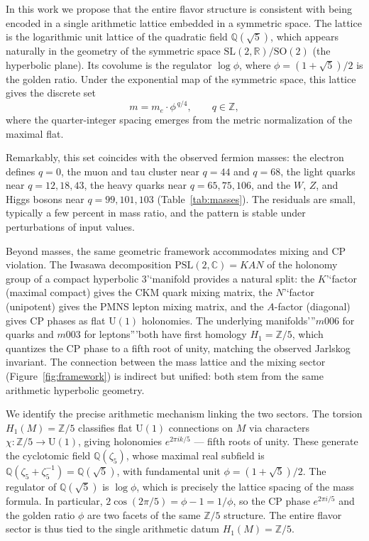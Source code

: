 \documentclass[12pt]{article}
\theoremstyle{definition}
\begin{document}
In this work we propose that the entire flavor structure is consistent with being encoded in a single arithmetic lattice embedded in a symmetric space. The lattice is the logarithmic unit lattice of the quadratic field $\mathbb{Q}(\sqrt5)$, which appears naturally in the geometry of the symmetric space $\mathrm{SL}(2,\mathbb{R})/\mathrm{SO}(2)$ (the hyperbolic plane). Its covolume is the regulator $\log\phi$, where $\phi = (1+\sqrt5)/2$ is the golden ratio. Under the exponential map of the symmetric space, this lattice gives the discrete set
\[
m = m_e \cdot \phi^{\,q/4},\qquad q\in\mathbb{Z},
\]
where the quarter-integer spacing emerges from the metric normalization of the maximal flat.

Remarkably, this set coincides with the observed fermion masses: the electron defines $q=0$, the muon and tau cluster near $q=44$ and $q=68$, the light quarks near $q=12,18,43$, the heavy quarks near $q=65,75,106$, and the $W$, $Z$, and Higgs bosons near $q=99,101,103$ (Table~\ref{tab:masses}). The residuals are small, typically a few percent in mass ratio, and the pattern is stable under perturbations of input values.

Beyond masses, the same geometric framework accommodates mixing and CP violation. The Iwasawa decomposition $\mathrm{PSL}(2,\mathbb{C}) = KAN$ of the holonomy group of a compact hyperbolic 3'`manifold provides a natural split: the $K$'`factor (maximal compact) gives the CKM quark mixing matrix, the $N$'`factor (unipotent) gives the PMNS lepton mixing matrix, and the $A$-factor (diagonal) gives CP phases as flat $\mathrm{U}(1)$ holonomies. The underlying manifolds'''$m006$ for quarks and $m003$ for leptons'''both have first homology $H_1 = \mathbb{Z}/5$, which quantizes the CP phase to a fifth root of unity, matching the observed Jarlskog invariant. The connection between the mass lattice and the mixing sector (Figure~\ref{fig:framework}) is indirect but unified: both stem from the same arithmetic hyperbolic geometry.

We identify the precise arithmetic mechanism linking the two sectors. The torsion $H_1(M)=\mathbb{Z}/5$ classifies flat $\mathrm{U}(1)$ connections on $M$ via characters $\chi: \mathbb{Z}/5 \to \mathrm{U}(1)$, giving holonomies $e^{2\pi i k/5}$ --- fifth roots of unity. These generate the cyclotomic field $\mathbb{Q}(\zeta_5)$, whose maximal real subfield is $\mathbb{Q}(\zeta_5 + \zeta_5^{-1}) = \mathbb{Q}(\sqrt{5})$, with fundamental unit $\phi = (1+\sqrt{5})/2$. The regulator of $\mathbb{Q}(\sqrt{5})$ is $\log\phi$, which is precisely the lattice spacing of the mass formula. In particular, $2\cos(2\pi/5) = \phi - 1 = 1/\phi$, so the CP phase $e^{2\pi i/5}$ and the golden ratio $\phi$ are two facets of the same $\mathbb{Z}/5$ structure. The entire flavor sector is thus tied to the single arithmetic datum $H_1(M) = \mathbb{Z}/5$.
\end{document}
